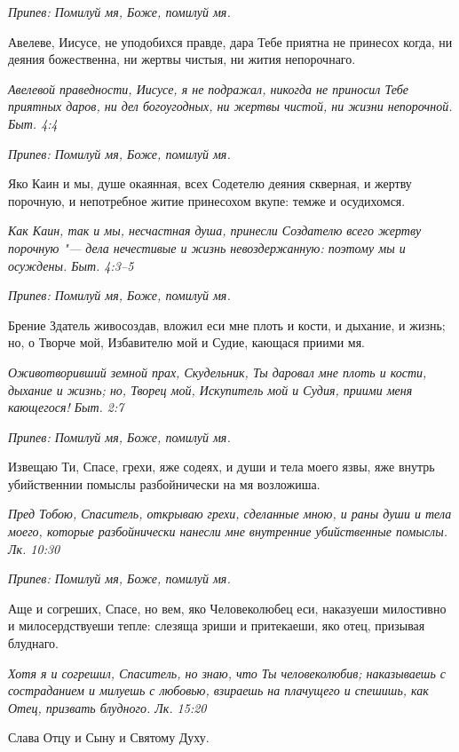 \itshape Припев:\normalfont{} Помилуй мя, Боже, помилуй мя.


Авелеве, Иисусе, не уподобихся правде, дара Тебе приятна не принесох когда, ни деяния божественна, ни жертвы чистыя, ни жития непорочнаго.


\itshape Авелевой праведности, Иисусе, я не подражал, никогда не приносил Тебе приятных даров, ни дел богоугодных, ни жертвы чистой, ни жизни непорочной. Быт. 4:4\normalfont{}


\itshape Припев:\normalfont{} Помилуй мя, Боже, помилуй мя.


Яко Каин и мы, душе окаянная, всех Содетелю деяния скверная, и жертву порочную, и непотребное житие принесохом вкупе: темже и осудихомся.


\itshape Как Каин, так и мы, несчастная душа, принесли Создателю всего жертву порочную "--- дела нечестивые и жизнь невоздержанную: поэтому мы и осуждены. Быт. 4:3–5\normalfont{}


\itshape Припев:\normalfont{} Помилуй мя, Боже, помилуй мя.


Брение Здатель живосоздав, вложил еси мне плоть и кости, и дыхание, и жизнь; но, о Творче мой, Избавителю мой и Судие, кающася приими мя.


\itshape Оживотворивший земной прах, Скудельник, Ты даровал мне плоть и кости, дыхание и жизнь; но, Творец мой, Искупитель мой и Судия, приими меня кающегося! Быт. 2:7\normalfont{}


\itshape Припев:\normalfont{} Помилуй мя, Боже, помилуй мя.


Извещаю Ти, Спасе, грехи, яже содеях, и души и тела моего язвы, яже внутрь убийственнии помыслы разбойнически на мя возложиша.


\itshape Пред Тобою, Спаситель, открываю грехи, сделанные мною, и раны души и тела моего, которые разбойнически нанесли мне внутренние убийственные помыслы. Лк. 10:30\normalfont{}


\itshape Припев:\normalfont{} Помилуй мя, Боже, помилуй мя.


Аще и согреших, Спасе, но вем, яко Человеколюбец еси, наказуеши милостивно и милосердствуеши тепле: слезяща зриши и притекаеши, яко отец, призывая блуднаго.


\itshape Хотя я и согрешил, Спаситель, но знаю, что Ты человеколюбив; наказываешь с состраданием и милуешь с любовью, взираешь на плачущего и спешишь, как Отец, призвать блудного. Лк. 15:20\normalfont{}


Слава Отцу и Сыну и Святому Духу.


